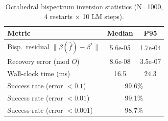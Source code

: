 \begin{table}[h]
\centering
\caption{Octahedral bispectrum inversion statistics (N=1000, 4 restarts $\times$ 10 LM steps).}
\label{tab:inversion-stats}
\begin{tabular}{lcc}
\toprule
Metric & Median & P95 \\
\midrule
Bisp.\ residual $\|\beta(\hat{f}) - \beta^*\|$ & 5.6e-05 & 1.7e-04 \\
Recovery error (mod $O$) & 8.6e-08 & 3.5e-07 \\
Wall-clock time (ms) & 16.5 & 24.3 \\
\midrule
Success rate (error $<0.1$) & \multicolumn{2}{c}{99.6\%} \\
Success rate (error $<0.01$) & \multicolumn{2}{c}{99.1\%} \\
Success rate (error $<0.001$) & \multicolumn{2}{c}{98.7\%} \\
\bottomrule
\end{tabular}
\end{table}

